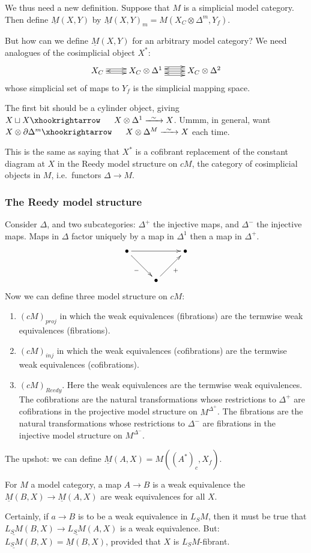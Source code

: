 \begin{AlexandreBousfieldLocalisation}
We thus need a new definition. Suppose that $M$ is a simplicial model category. Then define $\underline M(X,Y)$ by $\underline M(X,Y)_m=M(X_C\otimes\Delta^m,Y_f)$. 

But how can we define $\underline M(X,Y)$ for an arbitrary model category? We need analogues of the cosimplicial object $X^*$:
\[\xymatrix{X_C\ar@<.6ex>[r]\ar@<-.6ex>[r]&\ar[l] X_C\otimes\Delta^1
\ar[r]\ar@<1.2ex>[r]\ar@<-1.2ex>[r]&
\ar@<.6ex>[l]\ar@<-.6ex>[l]X_C\otimes\Delta^2
}\]
whose simplicial set of maps to $Y_f$ is the simplicial mapping space.

The first bit should be a cylinder object, giving $X\sqcup X\cofibration X\otimes \Delta^1\weakequiv X$. Ummm, in general, want $X\otimes\partial \Delta^m\cofibration X\otimes\Delta^M\weakequiv X$ each time.

This is the same as saying that $X^*$ is a cofibrant replacement of the constant diagram at $X$ in the Reedy model structure on $cM$, the category of cosimplicial objects in $M$, i.e.\ functors $\Delta\to M$.
\subsubsection*{The Reedy model structure}
Consider $\Delta$, and two subcategories: $\Delta^+$ the injective maps, and $\Delta^-$ the injective maps. Maps in $\Delta$ factor uniquely by a map in $\Delta^1$ then a map in $\Delta^+$.
\[\xymatrix{
\Bullet\ar[rr]\ar[rd]_{-}&&\Bullet\\
&\Bullet\ar[ru]_{+}
}\]
Now we can define three model structure on $cM$:
\begin{enumerate}
\item $(cM)_{proj}$ in which the weak equivalences (fibrations) are the termwise weak equivalences (fibrations).
\item $(cM)_{inj}$ in which the weak equivalences (cofibrations) are the termwise weak equivalences (cofibrations).
\item $(cM)_{Reedy}$. Here the weak equivalences are the termwise weak equivalences. The cofibrations are the natural transformations whose restrictions to $\Delta^+$ are cofibrations in the projective model structure on $M^{\Delta^+}$. The fibrations are the natural transformations whose restrictions to $\Delta^-$ are fibrations in the injective model structure on $M^{\Delta^-}$. 
\end{enumerate}
The upshot: we can define $\underline M(A,X)=M((A^*)_c,X_f)$.
\begin{prop*}
For $M$ a model category, a map $A\to B$ is a weak equivalence \Iff the $\underline M(B,X)\to\underline M(A,X)$ are weak equivalences for all $X$.
\end{prop*}
Certainly, if $a\to B$ is to be a weak equivalence in $L_SM$, then it must be true that $\underline{L_SM}(B,X)\to\underline{L_SM}(A,X)$ is a weak equivalence. But:
$\underline{L_SM}(B,X)=\underline M(B,X)$, provided that $X$ is $L_SM$-fibrant.

\end{AlexandreBousfieldLocalisation}
